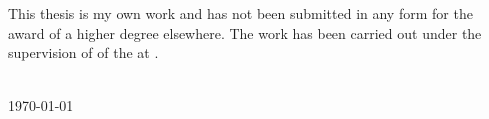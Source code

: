 \begin{declaration}
This thesis is my own work and has not been submitted in any form for the award of a higher degree elsewhere.
The work has been carried out under the supervision of \printSupervisor of the \printSchool at \printUniversity.

\vskip 2cm

\printAuthor
\\ \today
\end{declaration}
